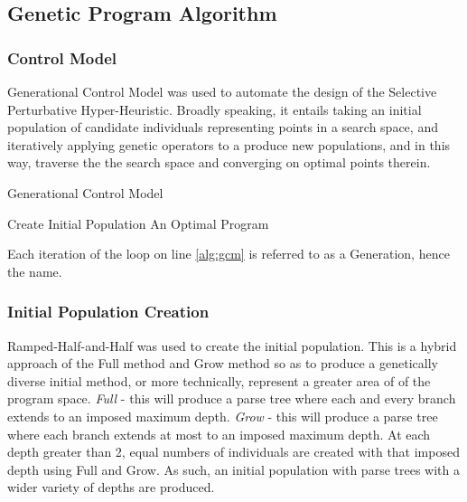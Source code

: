 \documentclass[a4paper,12pt]{article}
\begin{document}
    \subsection{Genetic Program Algorithm}
        \subsubsection*{Control Model} \label{subsubsec:controlmodel}
            \par{
                \noindent 
                Generational Control Model was used to automate the design of the Selective Perturbative Hyper-Heuristic. Broadly speaking, 
                it entails taking an initial population of candidate individuals representing points in a search space, and iteratively applying 
                genetic operators to a produce new populations, and in this way, traverse the the search space and converging on optimal points therein.  
                \newline     
                \begin{algorithm}[H]
                    \caption{Generational Control Model}
                    \SetAlgoLined
                    Create Initial Population\;
                    \Return An Optimal Program \; 
                   
                    
                \end{algorithm}
                \noindent Each iteration of the loop on line \ref{alg:gcm} is referred to as a Generation, hence the name. 
            }
        \subsubsection*{Initial Population Creation}
            \par{
                \noindent 
                Ramped-Half-and-Half was used to create the initial population. This is a hybrid approach of the Full method and Grow method so as to produce 
                a genetically diverse initial method, or more technically, represent a greater area of of the program space.\newline 
                \newline 
                \textit{Full} - this will produce a parse tree where each and every branch extends to an imposed maximum depth.\newline  
                \textit{Grow} - this will produce a parse tree where each branch extends at most to an imposed maximum depth. \newline 
                \newline 
                At each depth greater than 2, equal numbers of individuals are created with that imposed depth using Full and Grow. As such, an initial population with 
                parse trees with a wider variety of depths are produced. 
            }
        \newpage
\end{document}
